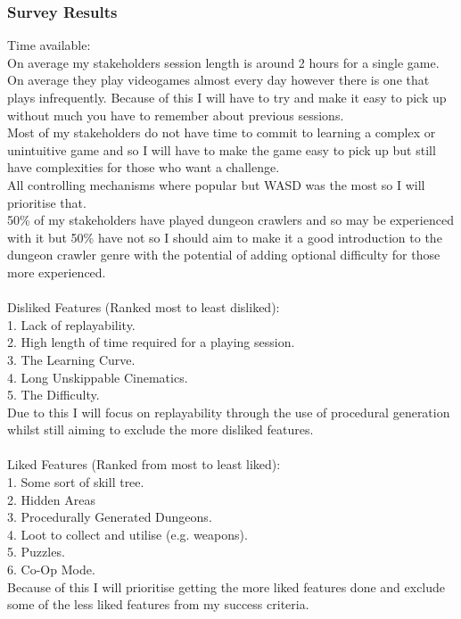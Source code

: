 \documentclass{article}
\begin{document}
        \subsubsection{Survey Results}
        Time available:\\
        On average my stakeholders session length is around 2 hours for a single game. On average they play videogames almost every day however there is one that plays infrequently. Because of this I will have to try and make it easy to pick up without much you have to remember about previous sessions.\\
        Most of my stakeholders do not have time to commit to learning a complex or unintuitive game and so I will have to make the game easy to pick up but still have complexities for those who want a challenge.\\
        All controlling mechanisms where popular but WASD was the most so I will prioritise that.\\
        50\% of my stakeholders have played dungeon crawlers and so may be experienced with it but 50\% have not so I should aim to make it a good introduction to the dungeon crawler genre with the potential of adding optional difficulty for those more experienced.\\
        \\
        Disliked Features (Ranked most to least disliked):\\
        1. Lack of replayability.\\
        2. High length of time required for a playing session.\\
        3. The Learning Curve.\\
        4. Long Unskippable Cinematics.\\
        5. The Difficulty.\\
        Due to this I will focus on replayability through the use of procedural generation whilst still aiming to exclude the more disliked features.\\
        \\
        Liked Features (Ranked from most to least liked):\\
        1. Some sort of skill tree.\\
        2. Hidden Areas\\
        3. Procedurally Generated Dungeons.\\
        4. Loot to collect and utilise (e.g. weapons).\\
        5. Puzzles.\\
        6. Co-Op Mode.\\
        Because of this I will prioritise getting the more liked features done and exclude some of the less liked features from my success criteria.\\
\end{document}
